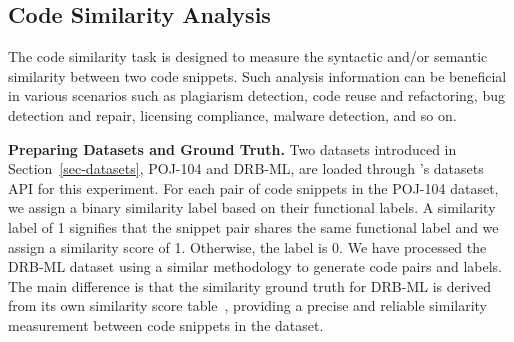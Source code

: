 \subsection{Code Similarity Analysis}
The code similarity task is designed to measure the syntactic and/or semantic similarity between two code snippets. Such analysis information can be beneficial in various scenarios such as plagiarism detection, code reuse and refactoring, bug detection and repair, licensing compliance, malware detection, and so on.

\textbf{Preparing Datasets and Ground Truth.}
Two datasets introduced in Section~\ref{sec-datasets}, POJ-104 and DRB-ML, are loaded through \ourwork's datasets API for this experiment.
For each pair of code snippets in the POJ-104 dataset, we assign a binary similarity label based on their functional labels.  A similarity label of 1 signifies that the snippet pair shares the same functional label and we assign a similarity score of 1. Otherwise, the label is 0. 
We have processed the DRB-ML dataset using a similar methodology to generate code pairs and labels. The main difference is that the similarity ground truth for DRB-ML is derived from its own similarity score table~\cite{chen2022early}, providing a precise and reliable similarity measurement between code snippets in the dataset.

